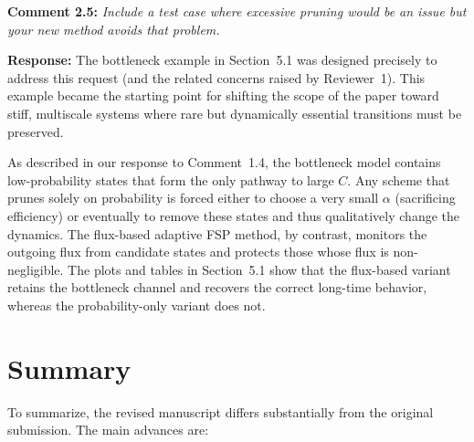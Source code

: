 \documentclass[11pt]{article}
\begin{document}
\medskip

\noindent\textbf{Comment 2.5:} \textit{Include a test case where excessive pruning would be an issue but
your new method avoids that problem.}

\textbf{Response:} The bottleneck example in Section~5.1 was designed precisely to
address this request (and the related concerns raised by Reviewer~1). This example
became the starting point for shifting the scope of the paper toward stiff,
multiscale systems where rare but dynamically essential transitions must be
preserved.

As described in our response to Comment~1.4, the bottleneck model contains
low-probability states that form the only pathway to large $C$. Any scheme that
prunes solely on probability is forced either to choose a very small $\alpha$
(sacrificing efficiency) or eventually to remove these states and thus
qualitatively change the dynamics. The flux-based adaptive FSP method, by contrast,
monitors the outgoing flux from candidate states and protects those whose flux is
non-negligible. The plots and tables in Section~5.1 show that the flux-based
variant retains the bottleneck channel and recovers the correct long-time
behavior, whereas the probability-only variant does not.

\section*{Summary}

To summarize, the revised manuscript differs substantially from the original
submission. The main advances are:
\end{document}
